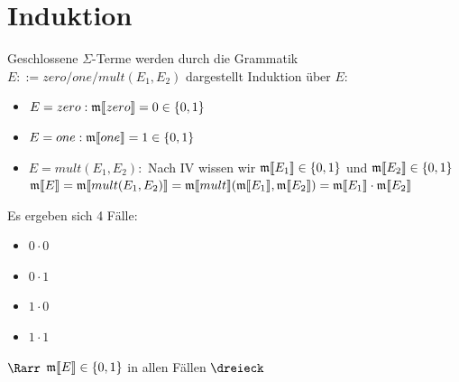 \documentclass{article}
\begin{document}
	\section{Induktion}
		Geschlossene $\Sigma$-Terme werden durch die Grammatik $E::=zero/one/mult(E_1,E_2)$ dargestellt \newline
		Induktion über $E$:
			\begin{itemize}
				\item $E=zero:\frak{m}\llbracket zero\rrbracket=0\in\{0, 1\}$
				\item $E=one:\frak{m}\llbracket one\rrbracket=1\in\{0, 1\}$
				\item $E=mult(E_1, E_2):$ Nach IV wissen wir $\frak{m}\llbracket E_1\rrbracket\in\{0, 1\}$ und $\frak{m}\llbracket E_2\rrbracket\in\{0, 1\}$ \newline
					$\frak{m}\llbracket E\rrbracket=\frak{m}\llbracket mult(E_1, E_2)\rrbracket=\frak{m}\llbracket mult\rrbracket(\frak{m}\llbracket E_1\rrbracket, \frak{m}\llbracket E_2\rrbracket) = \frak{m}\llbracket E_1\rrbracket \cdot \frak{m}\llbracket E_2\rrbracket$	
			\end{itemize}
		Es ergeben sich 4 Fälle:
			\begin{itemize}
				\item $0 \cdot 0$
				\item $0 \cdot 1$
				\item $1 \cdot 0$
				\item $1 \cdot 1$
			\end{itemize}
		$\Rarr$ $\frak{m}\llbracket E\rrbracket\in\{0, 1\}$ in allen Fällen
		$\dreieck$
\end{document}
